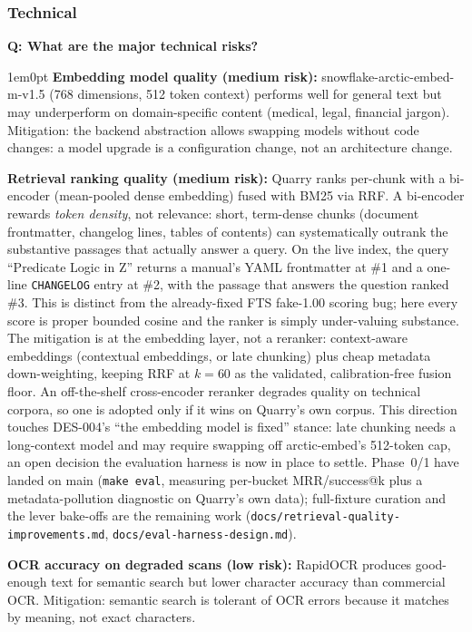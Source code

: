 \documentclass[11pt,letterpaper]{article}
\newcounter{faqnum}
\newenvironment{faqpair}[1]{%
  \needspace{4\baselineskip}%
  \vspace{0.5em}%
  \refstepcounter{faqnum}%
  \noindent\textbf{\color{SectionBlue}Q\thefaqnum: #1}\par\nopagebreak[4]%
  \vspace{0.2em}%
  \begin{adjustwidth}{1em}{0pt}%
  \setlength{\parindent}{0pt}%
}{%
  \end{adjustwidth}%
  \vspace{0.5em}%
}
\begin{document}
\subsubsection*{Technical}

\begin{faqpair}{What are the major technical risks?}\label{faq:tech-risks}
  \textbf{Embedding model quality (medium risk):} snowflake-arctic-embed-m-v1.5
  (768 dimensions, 512 token context) performs well for general text but may
  underperform on domain-specific content (medical, legal, financial jargon).
  Mitigation: the backend abstraction allows swapping models without code
  changes: a model upgrade is a configuration change, not an architecture change.

  \textbf{Retrieval ranking quality (medium risk):} Quarry ranks per-chunk with
  a bi-encoder (mean-pooled dense embedding) fused with BM25 via RRF. A
  bi-encoder rewards \emph{token density}, not relevance: short, term-dense
  chunks (document frontmatter, changelog lines, tables of contents) can
  systematically outrank the substantive passages that actually answer a query.
  On the live index, the query ``Predicate Logic in Z'' returns a manual's YAML
  frontmatter at \#1 and a one-line \texttt{CHANGELOG} entry at \#2, with the
  passage that answers the question ranked \#3. This is distinct from
  the already-fixed FTS fake-1.00 scoring bug; here every score is proper bounded
  cosine and the ranker is simply under-valuing substance. The mitigation is at
  the embedding layer, not a reranker: context-aware embeddings (contextual
  embeddings, or late chunking) plus cheap metadata down-weighting, keeping RRF
  at $k=60$ as the validated, calibration-free fusion floor. An off-the-shelf
  cross-encoder reranker degrades quality on technical corpora, so one is adopted
  only if it wins on Quarry's own corpus. This direction touches DES-004's ``the
  embedding model is fixed'' stance: late chunking needs a long-context model
  and may require swapping off arctic-embed's 512-token cap, an open decision
  the evaluation harness is now in place to settle. Phase~0/1 have landed on main
  (\texttt{make eval}, measuring per-bucket MRR/success@k plus a
  metadata-pollution diagnostic on Quarry's own data); full-fixture curation and
  the lever bake-offs are the remaining work
  (\texttt{docs/retrieval-quality-improvements.md},
  \texttt{docs/eval-harness-design.md}).

  \textbf{OCR accuracy on degraded scans (low risk):} RapidOCR produces
  good-enough text for semantic search but lower character accuracy than
  commercial OCR. Mitigation: semantic search is tolerant of OCR errors
  because it matches by meaning, not exact characters.


\end{faqpair}
\end{document}

